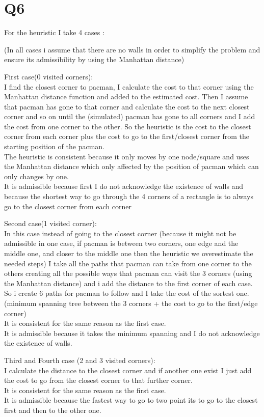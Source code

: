 \documentclass{article}
\begin{document}
\section{Q6}

For the heuristic I take 4 cases :

(In all cases i assume that there are no walls in order to simplify the problem and ensure its admissibility by using the Manhattan distance)

First case(0 visited corners):\\
I find the closest corner to pacman, I calculate the cost to that corner using the Manhattan distance function and added to the estimated cost. Then I assume that pacman has gone to that corner and calculate the cost to the next closest corner and so on until the (simulated) pacman has gone to all corners and I add the cost from one corner to the other. So the heuristic is the cost to the closest corner from each corner plus the cost to go to the first/closest corner from the starting position of the pacman.\\
The heuristic is consistent because it only moves by one node/square and uses the Manhattan distance which only affected by the position of pacman which can only changes by one. \\It is admissible because first I do not acknowledge the existence of walls and because the shortest way to go through the 4 corners of a rectangle is to always go to the closest corner from each corner

Second case(1 visited corner):\\
In this case instead of going to the closest corner (because it might not be admissible in one case, if pacman is between two corners, one edge and the middle one, and closer to the middle one then the heuristic we overestimate the needed steps) I take all the paths that pacman can take from one corner to the others creating all the possible ways that pacman can visit the 3 corners (using the Manhattan distance) and i add the distance to the first corner of each case. So i create 6 paths for pacman to follow and I take the cost of the sortest one. (minimum spanning tree between the 3 corners + the cost to go to the first/edge corner)\\
It is consistent for the same reason as the first case. \\
It is admissible because it takes the minimum spanning and I do not acknowledge the existence of walls.

Third and Fourth case (2 and 3 visited corners):\\
I calculate the distance to the closest corner and if another one exist I just add the cost to go from the closest corner to that further corner.\\
It is consistent for the same reason as the first case. \\
It is admissible because the fastest way to go to two point its to go to the closest first and then to the other one.
\end{document}
